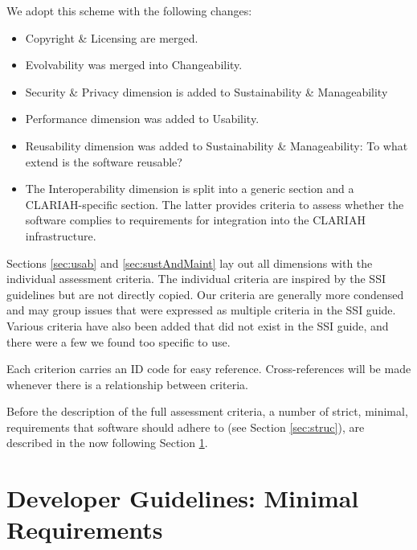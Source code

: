 \documentclass[a4paper,11pt]{article}
\begin{document}
We adopt this scheme with the following changes:

\begin{itemize}
\item Copyright \& Licensing are merged.
\item Evolvability was merged into Changeability.
\item Security \& Privacy dimension is added to Sustainability \& Manageability
\item Performance dimension was added to Usability.
\item Reusability dimension was added to Sustainability \& Manageability: To what extend is the software reusable?
%
%
%
\item The Interoperability dimension is split into a generic section and a
    CLARIAH-specific section. The latter provides criteria to assess
whether the software complies to requirements for integration into the CLARIAH infrastructure.
\end{itemize}

Sections \ref{sec:usab} and \ref{sec:sustAndMaint} lay out all dimensions with the individual assessment
criteria. The individual criteria are inspired by the SSI guidelines but
are not directly copied. Our criteria are generally more condensed and may
group issues that were expressed as multiple criteria in the SSI guide.
Various criteria have also been added that did not exist in the SSI guide,
and there were a few we found too specific to use.

Each criterion carries an ID code for easy reference. Cross-references will be
made whenever there is a relationship between criteria.

Before the description of the full assessment criteria, a number of strict,
minimal, requirements that software should adhere to (see Section
\ref{sec:struc}), are described in the now following Section \ref{sec:req}.

\section{Developer Guidelines: Minimal Requirements}\label{sec:req}
\end{document}

